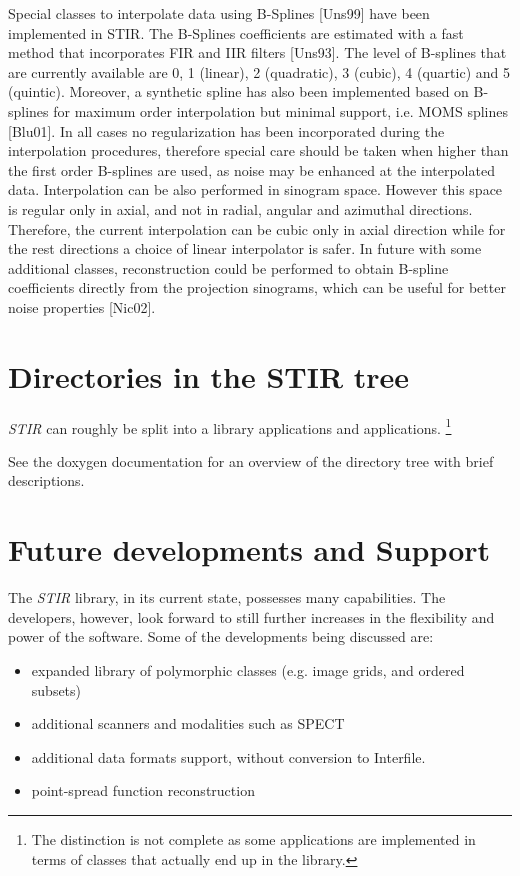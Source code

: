\documentclass{article}
\begin{document}
\label{sec:BSplines}
Special classes to interpolate data using B-Splines [Uns99] have been implemented in STIR. 
The B-Splines coefficients are estimated with a fast method that incorporates FIR and IIR 
filters [Uns93]. The level of B-splines that are currently available are 0, 1 (linear), 
2 (quadratic), 3 (cubic), 4 (quartic) and 5 (quintic). Moreover, a synthetic spline has also been 
implemented based on B-splines for maximum order interpolation but minimal support, i.e. MOMS 
splines [Blu01]. In all cases no regularization has been incorporated during the interpolation 
procedures, therefore special care should be taken when higher than the first order B-splines 
are used, as noise may be enhanced at the interpolated data. Interpolation can be also performed 
in sinogram space. However this space is regular only in axial, and not in radial, angular and 
azimuthal directions. Therefore, the current interpolation can be cubic only in axial direction 
while for the rest directions a choice of linear interpolator is safer. In future with some 
additional classes, reconstruction could be performed to obtain B-spline coefficients directly 
from the projection sinograms, which can be useful for better noise properties [Nic02].

\section{
Directories in the STIR tree}
\textit{STIR} can roughly be split into a library applications and applications.
\footnote{The distinction is not complete as some applications are implemented
in terms of classes that actually end up in the library.}

See the doxygen documentation for an overview of the directory tree with brief descriptions.

\section{
Future developments and Support}

The \textit{STIR} library, in its current state, possesses many capabilities. 
The developers, however, look forward to still further increases 
in the flexibility and power of the software. Some of the developments 
being discussed are:

\begin{itemize}
\item
expanded library of polymorphic classes (e.g. image grids, and 
ordered subsets)
\item
additional scanners and modalities such as SPECT
\item
additional data formats support, without conversion to Interfile.
\item
point-spread function reconstruction
\end{itemize}
\end{document}
